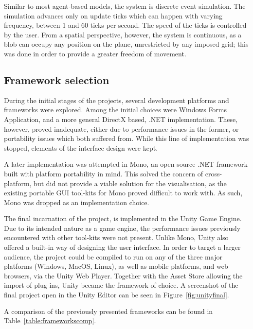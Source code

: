 Similar to most agent-based models, the system is discrete event simulation\cite{robinson2014simulation}. The simulation advances only on update ticks which can happen with varying frequency, between 1 and 60 ticks per second. The speed of the ticks is controlled by the user. From a spatial perspective, however, the system is continuous, as a blob can occupy any position on the plane, unrestricted by any imposed grid; this was done in order to provide a greater freedom of movement.

\subsection{Framework selection}
During the initial stages of the projects, several development platforms and frameworks were explored. Among the initial choices were Windows Forms Application, and a more general DirectX based, .NET implementation. These, however, proved inadequate, either due to performance issues in the former, or portability issues which both suffered from. While this line of implementation was stopped, elements of the interface design were kept.

A later implementation was attempted in Mono\cite{monoproject}, an open-source .NET framework built with platform portability in mind. This solved the concern of cross-platform, but did not provide a viable solution for the visualisation, as the existing portable GUI tool-kits for Mono proved difficult to work with. As such, Mono was dropped as an implementation choice.

The final incarnation of the project, is implemented in the Unity Game Engine. Due to its intended nature as a game engine, the performance issues previously encountered with other tool-kits were not present. Unlike Mono, Unity also offered a built-in way of designing the user interface. In order to target a larger audience, the project could be compiled to run on any of the three major platforms (Windows, MacOS, Linux), as well as mobile platforms, and web browsers, via the Unity Web Player. Together with the Asset Store allowing the import of plug-ins, Unity became the framework of choice. A screenshot of the final project open in the Unity Editor can be seen in Figure~\ref{fig:unityfinal}.

A comparison of the previously presented frameworks can be found in Table~\ref{table:frameworkscomp}.

